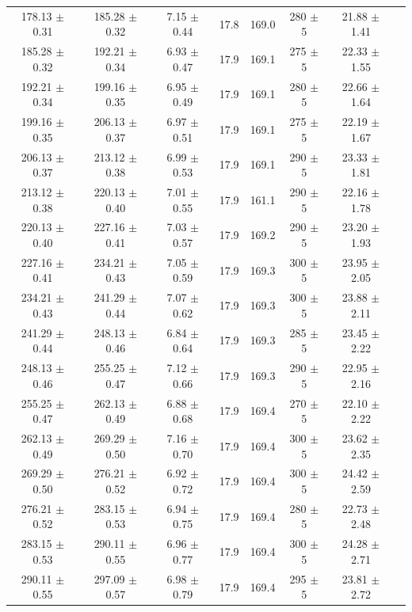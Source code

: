 \begin{table}[p]
\begin{tabular}{c c c c c c c c}
    178.13 $\pm$ 0.31 & 185.28 $\pm$ 0.32 & 7.15 $\pm$ 0.44 & 17.8 & 169.0 & 280 $\pm$ 5 & 21.88 $\pm$ 1.41 \\
    185.28 $\pm$ 0.32 & 192.21 $\pm$ 0.34 & 6.93 $\pm$ 0.47 & 17.9 & 169.1 & 275 $\pm$ 5 & 22.33 $\pm$ 1.55 \\
    192.21 $\pm$ 0.34 & 199.16 $\pm$ 0.35 & 6.95 $\pm$ 0.49 & 17.9 & 169.1 & 280 $\pm$ 5 & 22.66 $\pm$ 1.64 \\
    199.16 $\pm$ 0.35 & 206.13 $\pm$ 0.37 & 6.97 $\pm$ 0.51 & 17.9 & 169.1 & 275 $\pm$ 5 & 22.19 $\pm$ 1.67 \\
    206.13 $\pm$ 0.37 & 213.12 $\pm$ 0.38 & 6.99 $\pm$ 0.53 & 17.9 & 169.1 & 290 $\pm$ 5 & 23.33 $\pm$ 1.81 \\
    213.12 $\pm$ 0.38 & 220.13 $\pm$ 0.40 & 7.01 $\pm$ 0.55 & 17.9 & 161.1 & 290 $\pm$ 5 & 22.16 $\pm$ 1.78 \\
    220.13 $\pm$ 0.40 & 227.16 $\pm$ 0.41 & 7.03 $\pm$ 0.57 & 17.9 & 169.2 & 290 $\pm$ 5 & 23.20 $\pm$ 1.93 \\
    227.16 $\pm$ 0.41 & 234.21 $\pm$ 0.43 & 7.05 $\pm$ 0.59 & 17.9 & 169.3 & 300 $\pm$ 5 & 23.95 $\pm$ 2.05 \\
    234.21 $\pm$ 0.43 & 241.29 $\pm$ 0.44 & 7.07 $\pm$ 0.62 & 17.9 & 169.3 & 300 $\pm$ 5 & 23.88 $\pm$ 2.11 \\
    241.29 $\pm$ 0.44 & 248.13 $\pm$ 0.46 & 6.84 $\pm$ 0.64 & 17.9 & 169.3 & 285 $\pm$ 5 & 23.45 $\pm$ 2.22 \\
    248.13 $\pm$ 0.46 & 255.25 $\pm$ 0.47 & 7.12 $\pm$ 0.66 & 17.9 & 169.3 & 290 $\pm$ 5 & 22.95 $\pm$ 2.16 \\
    255.25 $\pm$ 0.47 & 262.13 $\pm$ 0.49 & 6.88 $\pm$ 0.68 & 17.9 & 169.4 & 270 $\pm$ 5 & 22.10 $\pm$ 2.22 \\
    262.13 $\pm$ 0.49 & 269.29 $\pm$ 0.50 & 7.16 $\pm$ 0.70 & 17.9 & 169.4 & 300 $\pm$ 5 & 23.62 $\pm$ 2.35 \\
    269.29 $\pm$ 0.50 & 276.21 $\pm$ 0.52 & 6.92 $\pm$ 0.72 & 17.9 & 169.4 & 300 $\pm$ 5 & 24.42 $\pm$ 2.59 \\
    276.21 $\pm$ 0.52 & 283.15 $\pm$ 0.53 & 6.94 $\pm$ 0.75 & 17.9 & 169.4 & 280 $\pm$ 5 & 22.73 $\pm$ 2.48 \\
    283.15 $\pm$ 0.53 & 290.11 $\pm$ 0.55 & 6.96 $\pm$ 0.77 & 17.9 & 169.4 & 300 $\pm$ 5 & 24.28 $\pm$ 2.71 \\
    290.11 $\pm$ 0.55 & 297.09 $\pm$ 0.57 & 6.98 $\pm$ 0.79 & 17.9 & 169.4 & 295 $\pm$ 5 & 23.81 $\pm$ 2.72 \\
    \bottomrule
  \end{tabular}
\end{table}

